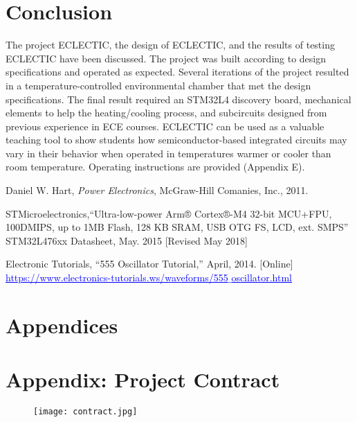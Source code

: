 \documentclass[11pt,letter]{article}
\begin{document}
\section{Conclusion}

The project ECLECTIC, the design of ECLECTIC, and the results of testing ECLECTIC have been discussed. The project was built according to design specifications and operated as expected. Several iterations of the project resulted in a temperature-controlled environmental chamber that met the design specifications. The final result required an STM32L4 discovery board, mechanical elements to help the heating/cooling process, and subcircuits designed from previous experience in ECE courses. ECLECTIC can be used as a valuable teaching tool to show students how semiconductor-based integrated circuits may vary in their behavior when operated in temperatures warmer or cooler than room temperature. Operating instructions are provided (Appendix E). 

\begin{thebibliography}{9}
Daniel W. Hart, \textit{Power Electronics}, McGraw-Hill Comanies, Inc., 2011.

STMicroelectronics,``Ultra-low-power Arm® Cortex®-M4 32-bit MCU+FPU, 100DMIPS, up to 1MB Flash, 128 KB SRAM, USB OTG FS, LCD, ext. SMPS'' STM32L476xx Datasheet, May. 2015
[Revised May 2018]

Electronic Tutorials, ``555 Oscillator Tutorial,'' April, 2014. [Online] \newline
\textcolor{blue}{\underline{https://www.electronics-tutorials.ws/waveforms/555$\_$oscillator.html}} 
\end{thebibliography}

\newpage



\appendix

\section*{Appendices}

\section{Appendix: Project Contract}

\begin{figure}[H]
    \centering
    \texttt{[image: contract.jpg]}
\end{figure}
\end{document}
